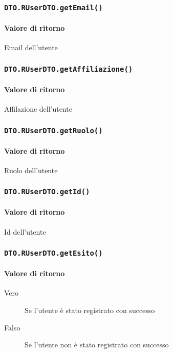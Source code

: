 \subsubsection{\texttt{DTO.RUserDTO.getEmail()}}
\paragraph{Valore di ritorno}
\begin{description}
\item Email dell'utente
\end{description}
\subsubsection{\texttt{DTO.RUserDTO.getAffiliazione()}}
\paragraph{Valore di ritorno}
\begin{description}
\item Affilazione dell'utente
\end{description}
\subsubsection{\texttt{DTO.RUserDTO.getRuolo()}}
\paragraph{Valore di ritorno}
\begin{description}
\item Ruolo dell'utente
\end{description}
\subsubsection{\texttt{DTO.RUserDTO.getId()}}
\paragraph{Valore di ritorno}
\begin{description}
\item Id dell'utente
\end{description}
\subsubsection{\texttt{DTO.RUserDTO.getEsito()}}
\paragraph{Valore di ritorno}
\begin{description}
\item [Vero] Se l'utente è stato registrato con successo
\item [Falso] Se l'utente non è stato registrato con successo
\end{description}


